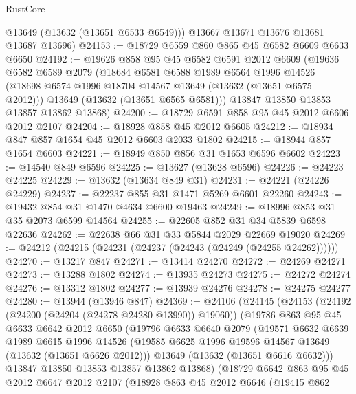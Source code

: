 \begin{lexlean}{RustCore}
\begin{coremodule}
        @13649
        (@13632 (@13651 @6533 @6549)))
      @13667
      @13671
      @13676
      @13681
      @13687
      @13696)
@24153 := @18729 @6559 @860 @865 @45 @6582 @6609 @6633 @6650
@24192 := @19626
    @858
    @95
    @45
    @6582
    @6591
    @2012
    @6609
    (@19636
      @6582
      @6589
      @2079
      (@18684
        @6581
        @6588
        @1989
        @6564
        @1996
        @14526
        (@18698 @6574 @1996 @18704 @14567 @13649 (@13632 (@13651 @6575 @2012)))
        @13649
        (@13632 (@13651 @6565 @6581)))
      @13847
      @13850
      @13853
      @13857
      @13862
      @13868)
@24200 := @18729 @6591 @858 @95 @45 @2012 @6606 @2012 @2107
@24204 := @18928 @858 @45 @2012 @6605
@24212 := @18934 @847 @857 @1654 @45 @2012 @6603 @2033 @1802
@24215 := @18944 @857 @1654 @6603
@24221 := @18949 @850 @856 @31 @1653 @6596 @6602
@24223 := @14540 @849 @6596
@24225 := @13627 (@13628 @6596)
@24226 := @24223 @24225
@24229 := @13632 (@13634 @849 @31)
@24231 := @24221 (@24226 @24229)
@24237 := @22237 @855 @31 @1471 @5269 @6601 @22260
@24243 := @19432 @854 @31 @1470 @4634 @6600 @19463
@24249 := @18996 @853 @31 @35 @2073 @6599 @14564
@24255 := @22605 @852 @31 @34 @5839 @6598 @22636
@24262 := @22638 @66 @31 @33 @5844 @2029 @22669 @19020
@24269 := @24212 (@24215 (@24231 (@24237 (@24243 (@24249 (@24255 @24262))))))
@24270 := @13217 @847
@24271 := @13414 @24270
@24272 := @24269 @24271
@24273 := @13288 @1802
@24274 := @13935 @24273
@24275 := @24272 @24274
@24276 := @13312 @1802
@24277 := @13939 @24276
@24278 := @24275 @24277
@24280 := @13944 (@13946 @847)
@24369 := @24106
    (@24145
      (@24153
        (@24192 (@24200 (@24204 (@24278 @24280 @13990)) @19060))
        (@19786
          @863
          @95
          @45
          @6633
          @6642
          @2012
          @6650
          (@19796
            @6633
            @6640
            @2079
            (@19571
              @6632
              @6639
              @1989
              @6615
              @1996
              @14526
              (@19585 @6625 @1996 @19596 @14567 @13649 (@13632 (@13651 @6626 @2012)))
              @13649
              (@13632 (@13651 @6616 @6632)))
            @13847
            @13850
            @13853
            @13857
            @13862
            @13868)
          (@18729
            @6642
            @863
            @95
            @45
            @2012
            @6647
            @2012
            @2107
            (@18928
              @863
              @45
              @2012
              @6646
              (@19415
                @862

\end{coremodule}
\end{lexlean}
